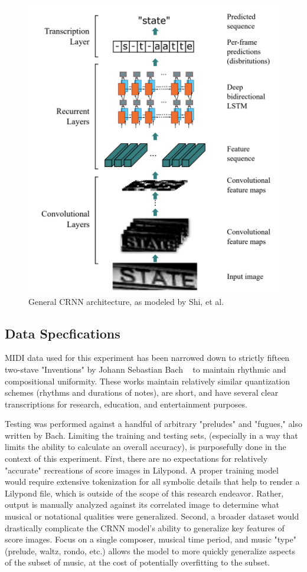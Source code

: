 \documentclass[sigconf]{acmart}
\begin{document}
\begin{figure}
	\centering
	\includegraphics[width = .8\linewidth]{./figures/crnn_arch.png}
	\caption{General CRNN architecture, as modeled by Shi, et al. ~\cite{shi2015endtoend}}
	\label{fig:crnn-arch}
\end{figure}

\subsection{Data Specfications}
MIDI data used for this experiment has been narrowed down to strictly fifteen two-stave "Inventions" by Johann Sebastian Bach ~\cite{bach_midi} to maintain rhythmic and compositional uniformity.
These works maintain relatively similar quantization schemes (rhythms and durations of notes), are short, and have several clear transcriptions for research, education, and entertainment purposes.

Testing was performed against a handful of arbitrary "preludes" and "fugues," also written by Bach. 
Limiting the training and testing sets, (especially in a way that limits the ability to calculate an overall accuracy), is purposefully done in the context of this experiment.
First, there are no expectations for relatively "accurate" recreations of score images in Lilypond. 
A proper training model would require extensive tokenization for all symbolic details that help to render a Lilypond file, which is outside of the scope of this research endeavor.
Rather, output is manually analyzed against its correlated image to determine what musical or notational qualities were generalized.
Second, a broader dataset would drastically complicate the CRNN model's ability to generalize key features of score images.
Focus on a single composer, musical time period, and music "type" (prelude, waltz, rondo, etc.) allows the model to more quickly generalize aspects of the subset of music, at the cost of potentially overfitting to the subset.
\end{document}
